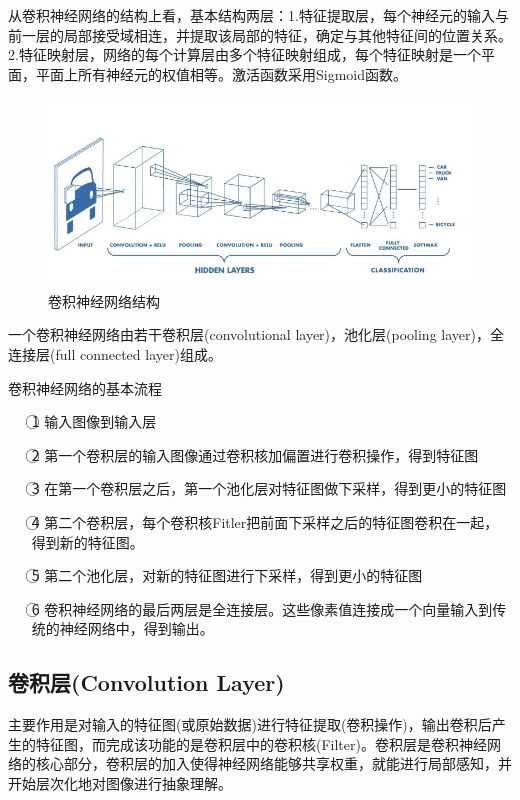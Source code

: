 \documentclass[openbib]{article}
\begin{document}
从卷积神经网络的结构上看，基本结构两层：1.特征提取层，每个神经元的输入与前一层的局部接受域相连，并提取该局部的特征，确定与其他特征间的位置关系。2.特征映射层，网络的每个计算层由多个特征映射组成，每个特征映射是一个平面，平面上所有神经元的权值相等。激活函数采用Sigmoid函数。

\begin{figure}[htbp]
	\centering
	\includegraphics[scale=0.38]{卷积神经网络结构.jpg}
	\caption{卷积神经网络结构}
\end{figure}

一个卷积神经网络由若干卷积层(convolutional layer)，池化层(pooling layer)，全连接层(full connected layer)组成。
\begin{center}
	卷积神经网络的基本流程
\end{center}
\begin{itemize}
	\item[\textcircled{1}] 输入图像到输入层
	\item[\textcircled{2}] 第一个卷积层的输入图像通过卷积核加偏置进行卷积操作，得到特征图
	\item[\textcircled{3}] 在第一个卷积层之后，第一个池化层对特征图做下采样，得到更小的特征图
	\item[\textcircled{4}] 第二个卷积层，每个卷积核Fitler把前面下采样之后的特征图卷积在一起，得到新的特征图。
	\item[\textcircled{5}] 第二个池化层，对新的特征图进行下采样，得到更小的特征图
	\item[\textcircled{6}] 卷积神经网络的最后两层是全连接层。这些像素值连接成一个向量输入到传统的神经网络中，得到输出。
\end{itemize}

\subsection{卷积层(Convolution Layer)}

主要作用是对输入的特征图(或原始数据)进行特征提取(卷积操作)，输出卷积后产生的特征图，而完成该功能的是卷积层中的卷积核(Filter)。卷积层是卷积神经网络的核心部分，卷积层的加入使得神经网络能够共享权重，就能进行局部感知，并开始层次化地对图像进行抽象理解。
\end{document}
